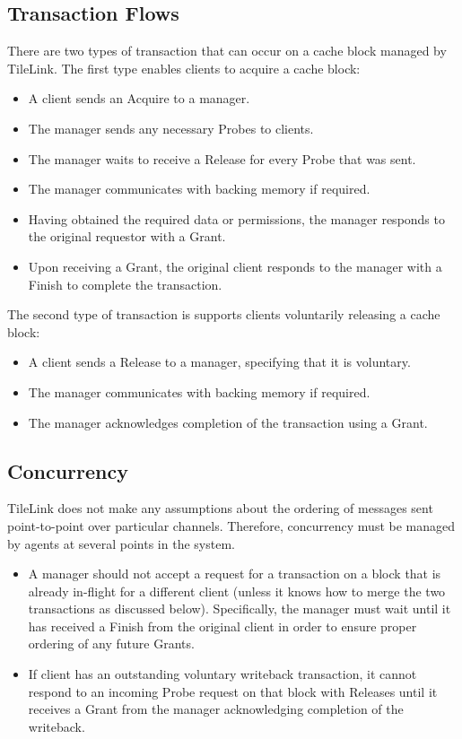 \subsection{Transaction Flows}

There are two types of transaction that can occur on a cache block managed by TileLink. The first type enables clients to acquire a cache block:
\begin{itemize}
\item A client sends an Acquire to a manager.
\item The manager sends any necessary Probes to clients.
\item The manager waits to receive a Release for every Probe that was sent.
\item The manager communicates with backing memory if required.
\item Having obtained the required data or permissions, the manager responds to the original requestor with a Grant.
\item Upon receiving a Grant, the original client responds to the manager with a Finish to complete the transaction.
\end{itemize}

The second type of transaction is supports clients voluntarily releasing a cache block:
\begin{itemize}
\item A client sends a Release to a manager, specifying that it is voluntary.
\item The manager communicates with backing memory if required.
\item The manager acknowledges completion of the transaction using a Grant.
\end{itemize}

\subsection{Concurrency}

TileLink does not make any assumptions about the ordering of messages sent point-to-point over particular channels.
Therefore, concurrency must be managed by agents at several points in the system.
\begin{itemize}
\item A manager should not accept a request for a transaction on a block that is already in-flight for a different client (unless it knows how to merge the two transactions as discussed below). Specifically, the manager must wait until it has received a Finish from the original client in order to ensure proper ordering of any future Grants.
\item If client has an outstanding voluntary writeback transaction, it cannot respond to an incoming Probe request on that block with Releases until it receives a Grant from the manager acknowledging completion of the writeback.
\end{itemize}

